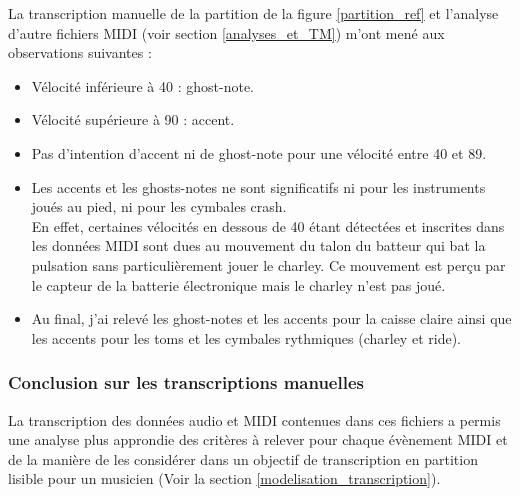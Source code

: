 La transcription manuelle de la partition de la figure \ref{partition_ref} et
l'analyse d'autre fichiers MIDI (voir section \ref{analyses_et_TM}) m’ont mené
aux observations suivantes :
\begin{itemize}
	\item Vélocité inférieure à 40 : ghost-note.
	\item Vélocité supérieure à 90 : accent.
	\item Pas d’intention d’accent ni de ghost-note pour une vélocité entre 40
        et 89.
	\item Les accents et les ghosts-notes ne sont significatifs ni pour les
        instruments joués au pied, ni pour les cymbales crash.\\
	En effet, certaines vélocités en dessous de 40 étant détectées et inscrites
    dans les données MIDI sont dues au mouvement du talon du batteur qui bat la
    pulsation sans particulièrement jouer le charley. Ce mouvement est perçu
    par le capteur de la batterie électronique mais le charley n’est pas joué.
	\item Au final, j’ai relevé les ghost-notes et les accents pour la caisse
        claire ainsi que les accents pour les toms et les cymbales rythmiques
        (charley et ride).
\end{itemize}


\subsubsection{Conclusion sur les transcriptions manuelles}
La transcription des données audio et MIDI contenues dans ces fichiers a permis
une analyse plus approndie des critères à relever pour chaque évènement MIDI et
de la manière de les considérer dans un objectif de transcription en partition
lisible pour un musicien (Voir la section \ref{modelisation_transcription}).


